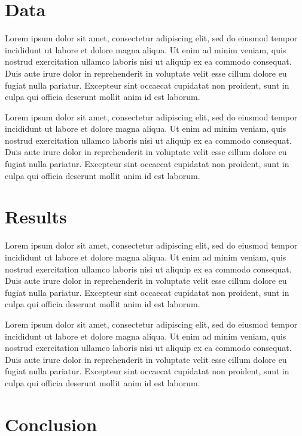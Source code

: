 \documentclass[12pt]{article}
\begin{document}
\begin{spacing}{1.4}
\section{Data} 
\label{Sec:Data}

Lorem ipsum dolor sit amet, consectetur adipiscing elit, sed do eiusmod tempor incididunt ut labore et dolore magna aliqua. Ut enim ad minim veniam, quis nostrud exercitation ullamco laboris nisi ut aliquip ex ea commodo consequat. Duis aute irure dolor in reprehenderit in voluptate velit esse cillum dolore eu fugiat nulla pariatur. Excepteur sint occaecat cupidatat non proident, sunt in culpa qui officia deserunt mollit anim id est laborum.

Lorem ipsum dolor sit amet, consectetur adipiscing elit, sed do eiusmod tempor incididunt ut labore et dolore magna aliqua. Ut enim ad minim veniam, quis nostrud exercitation ullamco laboris nisi ut aliquip ex ea commodo consequat. Duis aute irure dolor in reprehenderit in voluptate velit esse cillum dolore eu fugiat nulla pariatur. Excepteur sint occaecat cupidatat non proident, sunt in culpa qui officia deserunt mollit anim id est laborum.

\section{Results} 
\label{Sec:Results}

Lorem ipsum dolor sit amet, consectetur adipiscing elit, sed do eiusmod tempor incididunt ut labore et dolore magna aliqua. Ut enim ad minim veniam, quis nostrud exercitation ullamco laboris nisi ut aliquip ex ea commodo consequat. Duis aute irure dolor in reprehenderit in voluptate velit esse cillum dolore eu fugiat nulla pariatur. Excepteur sint occaecat cupidatat non proident, sunt in culpa qui officia deserunt mollit anim id est laborum.

Lorem ipsum dolor sit amet, consectetur adipiscing elit, sed do eiusmod tempor incididunt ut labore et dolore magna aliqua. Ut enim ad minim veniam, quis nostrud exercitation ullamco laboris nisi ut aliquip ex ea commodo consequat. Duis aute irure dolor in reprehenderit in voluptate velit esse cillum dolore eu fugiat nulla pariatur. Excepteur sint occaecat cupidatat non proident, sunt in culpa qui officia deserunt mollit anim id est laborum.

\section{Conclusion}
\label{Sec:Conclusion}


\end{spacing}
\end{document}
